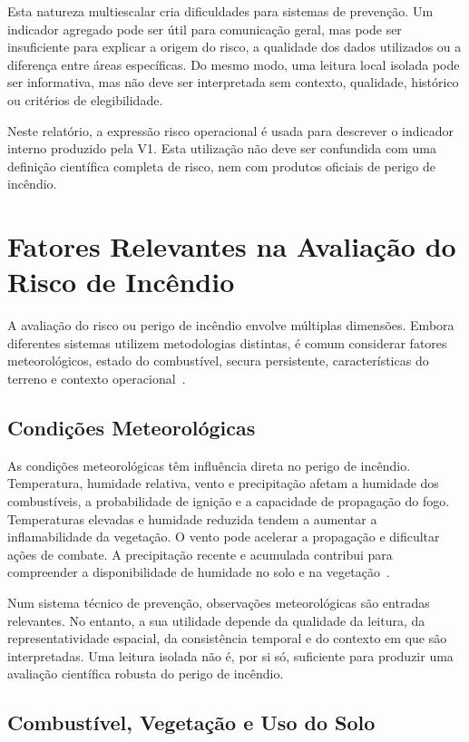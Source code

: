 Esta natureza multiescalar cria dificuldades para sistemas de prevenção. Um indicador agregado pode ser útil para comunicação geral, mas pode ser insuficiente para explicar a origem do risco, a qualidade dos dados utilizados ou a diferença entre áreas específicas. Do mesmo modo, uma leitura local isolada pode ser informativa, mas não deve ser interpretada sem contexto, qualidade, histórico ou critérios de elegibilidade.

Neste relatório, a expressão risco operacional é usada para descrever o indicador interno produzido pela V1. Esta utilização não deve ser confundida com uma definição científica completa de risco, nem com produtos oficiais de perigo de incêndio.

\section{Fatores Relevantes na Avaliação do Risco de Incêndio}

A avaliação do risco ou perigo de incêndio envolve múltiplas dimensões. Embora diferentes sistemas utilizem metodologias distintas, é comum considerar fatores meteorológicos, estado do combustível, secura persistente, características do terreno e contexto operacional~\citep{nrcan_fwi_system,keetch_byram_1968,haines_1988}.

\subsection{Condições Meteorológicas}

As condições meteorológicas têm influência direta no perigo de incêndio. Temperatura, humidade relativa, vento e precipitação afetam a humidade dos combustíveis, a probabilidade de ignição e a capacidade de propagação do fogo. Temperaturas elevadas e humidade reduzida tendem a aumentar a inflamabilidade da vegetação. O vento pode acelerar a propagação e dificultar ações de combate. A precipitação recente e acumulada contribui para compreender a disponibilidade de humidade no solo e na vegetação~\citep{nrcan_fwi_system,wmo_no8}.

Num sistema técnico de prevenção, observações meteorológicas são entradas relevantes. No entanto, a sua utilidade depende da qualidade da leitura, da representatividade espacial, da consistência temporal e do contexto em que são interpretadas. Uma leitura isolada não é, por si só, suficiente para produzir uma avaliação científica robusta do perigo de incêndio.

\subsection{Combustível, Vegetação e Uso do Solo}

